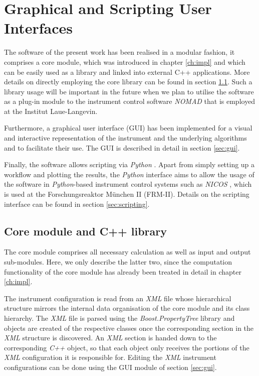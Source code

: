 %
%

\chapter{Graphical and Scripting User Interfaces}
\label{ch:gui}

The software of the present work has been realised in a modular fashion, it comprises a core
module, which was introduced in chapter \ref{ch:impl} and which can be easily used as a library 
and linked into external C++ applications. 
More details on directly employing the core library can be found in section \ref{sec:library}.
Such a library usage will be important in the future when we plan to utilise the software as a 
plug-in module to the instrument control software \textit{NOMAD} \cite{web_NOMAD} that is 
employed at the Institut Laue-Langevin.

Furthermore, a graphical user interface (GUI) has been implemented for a visual and interactive 
representation of the instrument and the underlying algorithms and to facilitate their use. 
The GUI is described in detail in section \ref{sec:gui}.

Finally, the software allows scripting via \textit{Python} \cite{Rossum2011, web_python}. 
Apart from simply setting up a workflow and plotting the results, the \textit{Python} interface 
aims to allow the usage of the software in \textit{Python}-based instrument control systems such as 
\textit{NICOS} \cite{web_NICOS}, which is used at the Forschungsreaktor M\"unchen II (FRM-II). 
Details on the scripting interface can be found in section \ref{sec:scripting}.



\section{Core module and C++ library}
\label{sec:library}
The core module comprises all necessary calculation as well as input and output sub-modules. 
Here, we only describe the latter two, since the computation functionality of the core module 
has already been treated in detail in chapter \ref{ch:impl}.

The instrument configuration is read from an \textit{XML} file whose hierarchical structure
mirrors the internal data organisation of the core module and its class hierarchy.
The \textit{XML} file is parsed using the \textit{Boost.PropertyTree} library \cite{web_boost_proptree}
and objects are created of the respective classes once the corresponding section in the \textit{XML}
structure is discovered. An \textit{XML} section is handed down to the corresponding \textit{C++} object,
so that each object only receives the portions of the \textit{XML} configuration it is responsible for.
Editing the \textit{XML} instrument configurations can be done using the GUI module of section \ref{sec:gui}.

